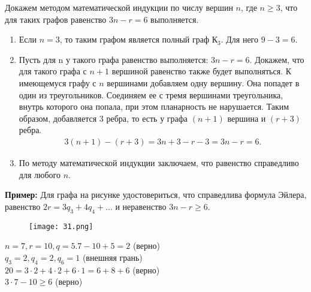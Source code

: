 \newpage
Докажем методом математической индукции по числу вершин $n$, где $n \geq 3$,
что для таких графов равенство $3n - r = 6$ выполняется.

\begin{enumerate}[left=0.0em, labelsep=1em, topsep=0.0em, itemsep=0pt, parsep=0.5em]
    \item Если $n=3$, то таким графом является полный граф $К_3$. Для него $9-3 =6$.
    \item Пусть для n у такого графа равенство выполняется: $3n - r =6$. Докажем,
    что для такого графа с $n+1$ вершиной равенство также будет
    выполняться.
    К имеющемуся графу с $n$ вершинами добавляем одну вершину. Она
    попадет в один из треугольников. Соединяем ее с тремя вершинами
    треугольника, внутрь которого она попала, при этом планарность не
    нарушается. Таким образом, добавляется 3 ребра, то есть у графа $(n+1)$
    вершина и $(r+3)$ ребра.
    \begin{align*}
        3(n+1) - (r+3) = 3n + 3 - r - 3 = 3n - r =6.
    \end{align*}
    \item По методу математической индукции заключаем, что равенство
    справедливо для любого $n$.
\end{enumerate}

\textbf{Пример:} Для графа на рисунке удостовериться, что справедлива формула
Эйлера, равенство $2r = 3q_3 + 4q_4 + \dots$ и неравенство $3n - r \geq 6$.
\begin{figure}[h]
    \centering
    \texttt{[image: 31.png]}
\end{figure}

$n=7, r = 10, q=5. 7-10+5 =2$ (верно)\\
$q_3 =2, q_4 = 2, q_6 = 1$ (внешняя грань)\\
$20 = 3 \cdot 2+ 4 \cdot 2 + 6 \cdot 1 = 6+8+6$ (верно)\\
$3 \cdot 7 - 10 \geq 6$ (верно)